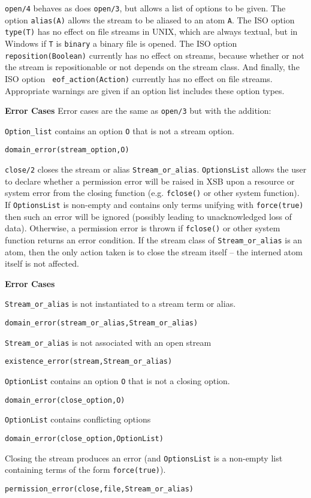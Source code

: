 \begin{description}
%
{\tt open/4} behaves as does {\tt open/3}, but allows a list of
options to be given.  The option {\tt alias(A)} allows the stream to
be aliased to an atom {\tt A}.  The ISO option {\tt type(T)} has no
effect on file streams in UNIX, which are always textual, but in
Windows if {\tt T} is {\tt binary} a binary file is opened.  The ISO
option {\tt reposition(Boolean)} currently has no effect on streams,
because whether or not the stream is repositionable or not depends on
the stream class.  And finally, the ISO option {\tt
eof\_action(Action)} currently has no effect on file streams.
Appropriate warnings are given if an option list includes these option
types.

{\bf Error Cases}  Error cases are the same as {\tt open/3} but with
the addition: 
\bi
\item {\tt Option\_list} contains an option {\tt O} that is not a stream
option.
\bi
\item {\tt domain\_error(stream\_option,O)}
\ei
\ei

%
{\tt close/2} closes the stream or alias {\tt Stream\_or\_alias}.
{\tt OptionsList} allows the user to declare whether a permission
error will be raised in XSB upon a resource or system error from the
closing function (e.g. {\tt fclose()} or other system function).  If
{\tt OptionsList} is non-empty and contains only terms unifying with
{\tt force(true)} then such an error will be ignored (possibly leading
to unacknowledged loss of data).  Otherwise, a permission error is
thrown if {\tt fclose()} or other system function returns an error
condition.  If the stream class of {\tt Stream\_or\_alias} is an atom,
then the only action taken is to close the stream itself -- the
interned atom itself is not affected.

{\bf Error Cases}
\bi
\item 	{\tt Stream\_or\_alias} is not instantiated to a stream term or alias.
\bi
\item 	{\tt domain\_error(stream\_or\_alias,Stream\_or\_alias)}
\ei
\item 	{\tt Stream\_or\_alias} is not associated with an open stream
\bi
\item 	{\tt existence\_error(stream,Stream\_or\_alias)}
\ei
\item {\tt OptionList} contains an option {\tt O} that is not a closing
option.
\bi
\item {\tt domain\_error(close\_option,O)}
\ei
\item {\tt OptionList} contains conflicting options
\bi
\item {\tt domain\_error(close\_option,OptionList)}
\ei
\item 	Closing the stream produces an error (and {\tt OptionsList} is
	a non-empty list containing terms of the form {\tt force(true)}).
\bi
\item 	{\tt permission\_error(close,file,Stream\_or\_alias)}
\ei
\ei


\end{description}
